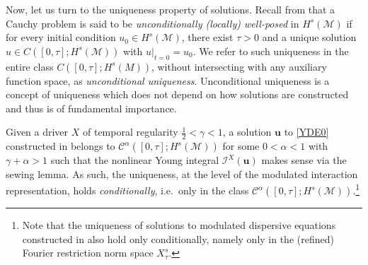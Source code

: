 \documentclass[letterpaper, 11pt,  reqno]{amsart}
\newcommand{\1}{\hspace{0.5mm}\text{I}\hspace{0.5mm}}
\newcommand{\I}{\mathcal{I}}
\newcommand{\CC}{\mathcal{C}}
\newcommand{\al}{\alpha}
\newcommand{\g}{\gamma}
\newcommand{\M}{\mathcal{M}}
\newcommand{\uu}{\mathbf{u}}
\numberwithin{equation}{section}
\numberwithin{theorem}{section}
\begin{document}
\medskip

Now, let us turn to the uniqueness property of  solutions.
Recall 
from  \cite{KATO} 
that  a Cauchy problem is  said to be {\it unconditionally (locally) well-posed}
in $H^s(\M)$
if for every initial condition $u_0 \in H^s(\M)$,
there exist $\tau >0$ and a unique solution $u \in C([0, \tau ];H^s(\M))$
with  $u|_{t = 0} = u_0$.
We refer to such uniqueness in the entire class $C([0, \tau ];H^s(M))$, 
without intersecting with any auxiliary function space, as {\it unconditional uniqueness}.
Unconditional uniqueness is a concept of uniqueness which does not depend
on how solutions are constructed
and thus is of fundamental importance.



Given a driver $X$ of temporal regularity $\frac 12 < \g < 1$, 
a solution $\uu$ to \eqref{YDE0} constructed in \cite{CG1, CGLLO1}
belongs to $\CC^\al([0, \tau] ; H^s(\M))$
for some $0 < \al < 1$ with $\g + \al > 1$
such that the nonlinear Young integral $\I^X(\uu)$
makes sense via the sewing lemma.
As such, 
 the uniqueness, at the level of the modulated interaction representation,  holds 
 {\it conditionally}, i.e.~only  in the class 
 $\CC^\al([0, \tau]; H^s(\M))$.\footnote{Note that the uniqueness
 of solutions to modulated dispersive equations
 constructed 
in \cite{Robert2, Robert3, Robert4}
also hold only conditionally, 
namely only in 
 the  (refined) Fourier restriction norm space $X^s_\tau $.}
 
\end{document}
